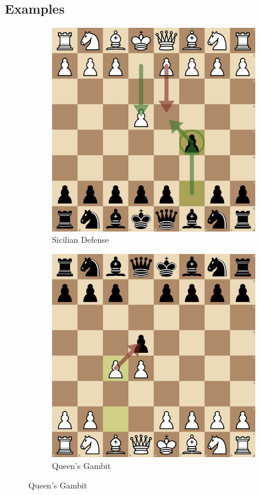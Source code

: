 \documentclass[a4paper, 11pt]{article}
\begin{document}
\begin{appendices}
\section{Examples}
\begin{figure}[H]
    \centering
    \caption{Examples of Chess Openings}
    \label{fig:examplesOfChessOpenings}
    \begin{subfigure}{0.49\textwidth}
        \centering
        \caption{Sicilian Defense}
        \includegraphics[width=\textwidth]{Example of Sicilian Defense.png}
    \end{subfigure}
    \hfill
    \begin{subfigure}{0.49\textwidth}
        \centering
        \caption{Queen's Gambit}
        \includegraphics[width=\textwidth]{Example of Queen's Gambit.png}

\end{subfigure}
\end{figure}
\end{appendices}
\end{document}
